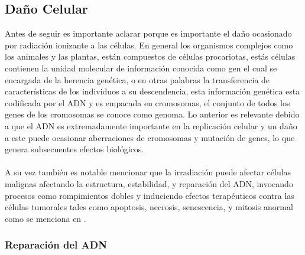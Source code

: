 \subsection{Daño Celular}
Antes de seguir es importante aclarar porque es importante el daño ocasionado por radiación ionizante a las células. En general los organismos complejos como los animales y las plantas, están compuestos de células procariotas, estás células contienen la unidad molecular de información conocida como gen el cual se encargada de la herencia genética, o en otras palabras la transferencia de características de los individuos a su descendencia, esta información genética esta codificada por el ADN y es empacada en cromosomas, el conjunto de todos los genes de los cromosomas se conoce como genoma. Lo anterior es relevante debido a que el ADN es extremadamente importante en la replicación celular y un daño a este puede ocasionar aberraciones de cromosomas y mutación de genes, lo que genera subsecuentes efectos biológicos.\\
\\
A su vez también es notable mencionar que la irradiación puede afectar células malignas afectando la estructura, estabilidad, y reparación del ADN, invocando procesos como rompimientos dobles y induciendo efectos terapéuticos contra las células tumorales tales como apoptosis, necrosis,  senescencia, y mitosis anormal como se menciona en \cite{cancer}.\\



\subsubsection{Reparación del ADN}

